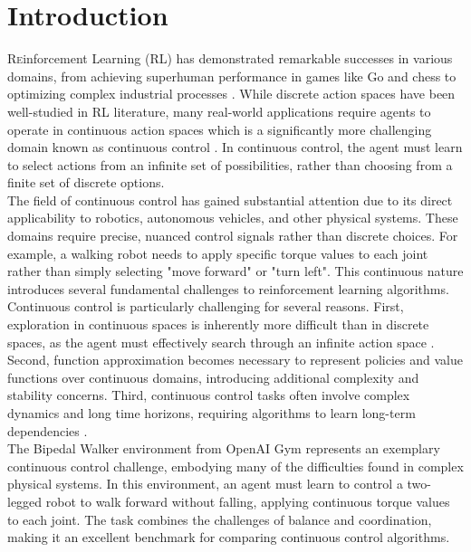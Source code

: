 \section{Introduction}

\lettrine[nindent=0em,lines=3]{R} einforcement Learning (RL) has demonstrated remarkable successes in various domains, from achieving superhuman performance in games like Go and chess \cite{doi:10.1126/science.aar6404} to optimizing complex industrial processes \cite{NEURIPS2018_059fdcd9}. While discrete action spaces have been well-studied in RL literature, many real-world applications require agents to operate in continuous action spaces which is a significantly more challenging domain known as continuous control \cite{lillicrap2019continuouscontroldeepreinforcement}.  In continuous control, the agent must learn to select actions from an infinite set of possibilities, rather than choosing from a finite set of discrete options.\\

\noindent The field of continuous control has gained substantial attention due to its direct applicability to robotics, autonomous vehicles, and other physical systems. These domains require precise, nuanced control signals rather than discrete choices. For example, a walking robot needs to apply specific torque values to each joint rather than simply selecting "move forward" or "turn left". This continuous nature introduces several fundamental challenges to reinforcement learning algorithms.\\

\noindent Continuous control is particularly challenging for several reasons. First, exploration in continuous spaces is inherently more difficult than in discrete spaces, as the agent must effectively search through an infinite action space \cite{duan2016benchmarkingdeepreinforcementlearning}. Second, function approximation becomes necessary to represent policies and value functions over continuous domains, introducing additional complexity and stability concerns. Third, continuous control tasks often involve complex dynamics and long time horizons, requiring algorithms to learn long-term dependencies \cite{lillicrap2019continuouscontroldeepreinforcement}.\\

\noindent The Bipedal Walker environment from OpenAI Gym represents an exemplary continuous control challenge, embodying many of the difficulties found in complex physical systems. In this environment, an agent must learn to control a two-legged robot to walk forward without falling, applying continuous torque values to each joint. The task combines the challenges of balance and coordination, making it an excellent benchmark for comparing continuous control algorithms.\\

